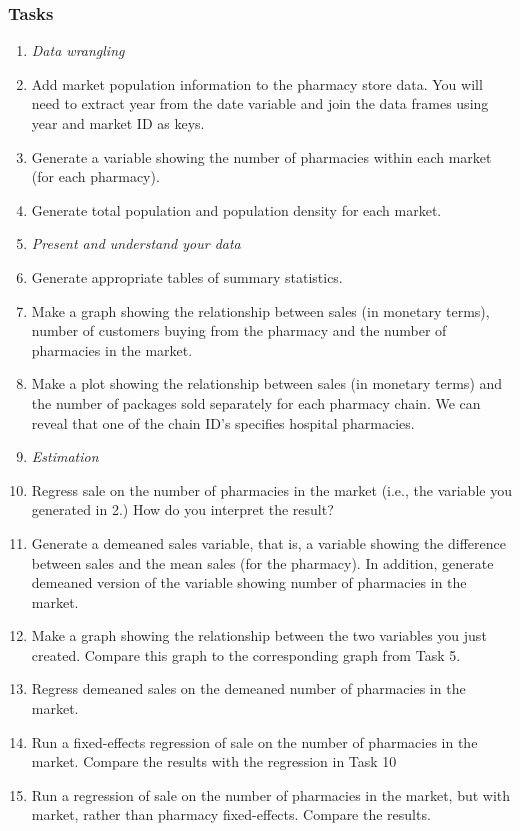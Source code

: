 \documentclass[12pt,a4paper]{article}
\begin{document}
{\subsubsection*{Tasks}
\begin{enumerate}
 \item[] \emph{Data wrangling}
 \item Add market population information to the pharmacy store data. You will need to extract year from the date variable and join the data frames using year and market ID as keys.
 \item Generate a variable showing the number of pharmacies within each market (for each pharmacy).
 \item Generate total population and population density for each market.
 \item[] \emph{Present and understand your data}
 \item Generate appropriate tables of summary statistics.
 \item Make a graph showing the relationship between sales (in monetary terms), number of customers buying from the pharmacy and the number of pharmacies in the market.
 \item Make a plot showing the relationship between sales (in monetary terms) and the number of packages sold separately for each pharmacy chain. We can reveal that one of the chain ID's specifies hospital pharmacies.
 \item[] \emph{Estimation}
 \item Regress sale on the number of pharmacies in the market (i.e., the variable you generated in 2.) How do you interpret 
 the result?
 \item Generate a demeaned sales variable, that is, a variable showing the difference between sales and the mean sales (for the pharmacy). In addition, generate demeaned version of the variable showing number of pharmacies in the market.
 \item Make a graph showing the relationship between the two variables you just created. Compare this graph to the corresponding graph from Task 5.
 \item Regress demeaned sales on the demeaned number of pharmacies in the market.
 \item Run a fixed-effects regression of sale on the number of pharmacies in the market. Compare the results with the regression in Task 10
 \item Run a regression of sale on the number of pharmacies in the market, but with market, rather than pharmacy fixed-effects. Compare the results.

\end{enumerate}}
\end{document}
